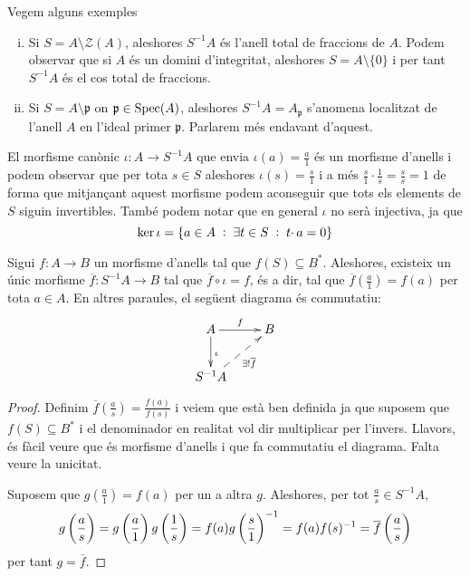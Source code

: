 \documentclass[../../../main.tex]{subfiles}
\begin{document}
\begin{ej}
Vegem alguns exemples
\begin{enumerate}[(i)]
    \item Si $S = A\setminus\mathcal{Z}(A)$, aleshores $S^{-1}A$ és l'anell total de fraccions de $A$. Podem observar que si $A$ és un domini d'integritat, aleshores $S = A\setminus\{0\}$ i per tant $S^{-1}A$ és el cos total de fraccions.
    \item Si $S = A\setminus\mathfrak{p}$ on $\mathfrak{p} \in \mathrm{Spec}(A)$, aleshores $S^{-1}A = A_\mathfrak{p}$ s'anomena localitzat de l'anell $A$ en l'ideal primer $\mathfrak{p}$. Parlarem més endavant d'aquest.
\end{enumerate}
\end{ej}

\begin{nota}
El morfisme canònic $\iota:A\to S^{-1}A$ que envia $\iota(a) = \frac{a}{1}$ és un morfisme d'anells i podem observar que per tota $s\in S$ aleshores $\iota(s) = \frac{s}{1}$ i a més $\frac{s}{1}\cdotp\frac{1}{s} = \frac{s}{s} = 1$ de forma que mitjançant aquest morfisme podem aconseguir que tots els elements de $S$ siguin invertibles. També podem notar que en general $\iota$ no serà injectiva, ja que
\begin{equation}
    \notag
    \ker\iota = \{a\in A\;:\;\exists t\in S\;:\;t\cdotp a = 0\}
\end{equation}
\end{nota}


\begin{prop}
\label{prop:propietatUniversalAnellDeFraccions} Sigui $f:A\to B$ un morfisme d'anells tal que $f(S)\subseteq B^*$. Aleshores, existeix un únic morfisme $\overline{f}:S^{-1}A\to B$ tal que $\overline{f}\circ\iota = f$, és a dir, tal que $\overline{f}(\frac{a}{1}) = f(a)$ per tota $a\in A$. En altres paraules, el següent diagrama és commutatiu:
\begin{equation}
    \notag
    \xymatrix{
    A\ar[r]^f\ar[d]^\iota & B\\
    S^{-1}A\ar@{-->}[ur]_{\exists!\overline{f}} & 
    }
\end{equation}
\end{prop}
\begin{proof}
Definim $\overline{f}(\frac{a}{s}) = \frac{f(a)}{f(s)}$ i veiem que està ben definida ja que suposem que $f(S)\subseteq B^*$ i el denominador en realitat vol dir multiplicar per l'invers. Llavors, és fàcil veure que és morfisme d'anells i que fa commutatiu el diagrama. Falta veure la unicitat.

Suposem que $g(\frac{a}{1}) = f(a)$ per un a altra $g$. Aleshores, per tot $\frac{a}{s}\in S^{-1}A$,
\begin{equation}
    \notag
    g\left(\frac{a}{s}\right) = g\left(\frac{a}{1}\right)g\left(\frac{1}{s}\right) = f(a)g\left(\frac{s}{1}\right)^{-1} = f(a)f(s)^{-1} = \overline{f}\left(\frac{a}{s}\right)
\end{equation}
per tant $g = \overline{f}$.
\end{proof}
\end{document}

